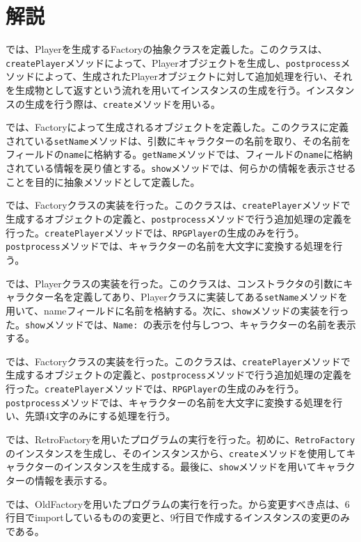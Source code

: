 \documentclass[uplatex]{jsarticle}
\begin{document}
\section{解説}
では、Playerを生成するFactoryの抽象クラスを定義した。このクラスは、{\tt createPlayer}メソッドによって、Playerオブジェクトを生成し、{\tt postprocess}メソッドによって、生成されたPlayerオブジェクトに対して追加処理を行い、それを生成物として返すという流れを用いてインスタンスの生成を行う。インスタンスの生成を行う際は、{\tt create}メソッドを用いる。


では、Factoryによって生成されるオブジェクトを定義した。このクラスに定義されている{\tt setName}メソッドは、引数にキャラクターの名前を取り、その名前をフィールドの{\tt name}に格納する。{\tt getName}メソッドでは、フィールドの{\tt name}に格納されている情報を戻り値とする。{\tt show}メソッドでは、何らかの情報を表示させることを目的に抽象メソッドとして定義した。


では、Factoryクラスの実装を行った。このクラスは、{\tt createPlayer}メソッドで生成するオブジェクトの定義と、{\tt postprocess}メソッドで行う追加処理の定義を行った。{\tt createPlayer}メソッドでは、{\tt RPGPlayer}の生成のみを行う。{\tt postprocess}メソッドでは、キャラクターの名前を大文字に変換する処理を行う。


では、Playerクラスの実装を行った。このクラスは、コンストラクタの引数にキャラクター名を定義してあり、Playerクラスに実装してある{\tt setName}メソッドを用いて、nameフィールドに名前を格納する。次に、{\tt show}メソッドの実装を行った。{\tt show}メソッドでは、{\tt Name: }の表示を付与しつつ、キャラクターの名前を表示する。


では、Factoryクラスの実装を行った。このクラスは、{\tt createPlayer}メソッドで生成するオブジェクトの定義と、{\tt postprocess}メソッドで行う追加処理の定義を行った。{\tt createPlayer}メソッドでは、{\tt RPGPlayer}の生成のみを行う。{\tt postprocess}メソッドでは、キャラクターの名前を大文字に変換する処理を行い、先頭4文字のみにする処理を行う。


では、RetroFactoryを用いたプログラムの実行を行った。初めに、{\tt RetroFactory}のインスタンスを生成し、そのインスタンスから、{\tt create}メソッドを使用してキャラクターのインスタンスを生成する。最後に、{\tt show}メソッドを用いてキャラクターの情報を表示する。


では、OldFactoryを用いたプログラムの実行を行った。から変更すべき点は、6行目でimportしているものの変更と、9行目で作成するインスタンスの変更のみである。
\end{document}
